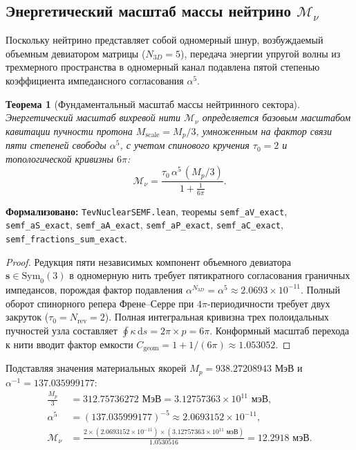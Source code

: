 \documentclass[11pt,a4paper]{article}
\newtheorem{theorem}{Теорема}
\theoremstyle{definition}
\theoremstyle{remark}
\begin{document}
\subsection{Энергетический масштаб массы нейтрино $\mathcal{M}_\nu$}
	
Поскольку нейтрино представляет собой одномерный шнур, возбуждаемый объемным девиатором матрицы ($N_{3D} = 5$), передача энергии упругой волны из трехмерного пространства в одномерный канал подавлена пятой степенью коэффициента импедансного согласования $\alpha^5$.
	
\begin{theorem}[Фундаментальный масштаб массы нейтринного сектора]
\label{thm:neutrino_scale_derivation}
Энергетический масштаб вихревой нити $\mathcal{M}_\nu$ определяется базовым масштабом кавитации пучности протона $M_{\mathrm{scale}} = M_p / 3$, умноженным на фактор связи пяти степеней свободы $\alpha^5$, с учетом спинового кручения $\tau_0 = 2$ и топологической кривизны $6\pi$:
\begin{equation}
\mathcal{M}_\nu = \frac{\tau_0 \, \alpha^5 \, (M_p / 3)}{1 + \frac{1}{6\pi}}.
\label{eq:neutrino_scale_formula}
\end{equation}
\end{theorem}

\noindent\small\textbf{Формализовано:} \texttt{TevNuclearSEMF.lean}, теоремы \texttt{semf_aV_exact}, \texttt{semf_aS_exact}, \texttt{semf_aA_exact}, \texttt{semf_aP_exact}, \texttt{semf_aC_exact}, \texttt{semf_fractions_sum_exact}.


	
\begin{proof}
	Редукция пяти независимых компонент объемного девиатора $\mathbf{s} \in \mathrm{Sym}_0(3)$ в одномерную нить требует пятикратного согласования граничных импедансов, порождая фактор подавления $\alpha^{N_{3D}} = \alpha^5 \approx 2.0693 \times 10^{-11}$. Полный оборот спинорного репера Френе--Серре при $4\pi$-периодичности требует двух закруток ($\tau_0 = N_{\mathrm{rev}} = 2$). Полная интегральная кривизна трех полоидальных пучностей узла составляет $\oint \kappa \, \mathrm{d}s = 2\pi \times p = 6\pi$. Конформный масштаб перехода к нити вводит фактор емкости $C_{\mathrm{geom}} = 1 + 1/(6\pi) \approx 1.053052$.
\end{proof}
	
Подставляя значения материальных якорей $M_p = 938.27208943\text{ МэВ}$ и $\alpha^{-1} = 137.035999177$:
\begin{align}
	\frac{M_p}{3} &= 312.75736272\text{ МэВ} = 3.12757363 \times 10^{11}\text{ мэВ}, \\
	\alpha^5 &= (137.035999177)^{-5} \approx 2.0693152 \times 10^{-11}, \\
	\mathcal{M}_\nu &= \frac{2 \times (2.0693152 \times 10^{-11}) \times (3.12757363 \times 10^{11}\text{ мэВ})}{1.0530516} = 12.2918\text{ мэВ}.
\end{align}
	
\end{document}
